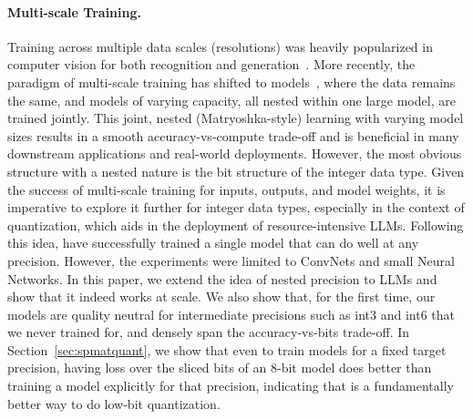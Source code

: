 \paragraph{Multi-scale Training.} Training across multiple data scales (resolutions) was heavily popularized in computer vision for both recognition and generation~\citep{adelson1984pyramid,lin2017feature,denton2015deep}. More recently, the paradigm of multi-scale training has shifted to models~\citep{rippel2014learning,yu2018slimmable,kusupati2022matryoshka,devvrit2023matformer}, where the data remains the same, and models of varying capacity, all nested within one large model, are trained jointly. This joint, nested (Matryoshka-style) learning with varying model sizes results in a smooth accuracy-vs-compute trade-off and is beneficial in many downstream applications and real-world deployments. However, the most obvious structure with a nested nature is the bit structure of the integer data type. Given the success of multi-scale training for inputs, outputs, and model weights, it is imperative to explore it further for integer data types, especially in the context of quantization, which aids in the deployment of resource-intensive LLMs. Following this idea, \citet{any_precision_dnn} have successfully trained a single model that can do well at any precision. However, the experiments were limited to ConvNets and small Neural Networks. In this paper, we extend the idea of nested precision to LLMs and show that it indeed works at scale. We also show that, for the first time, our models are quality neutral for intermediate precisions such as int3 and int6 that we never trained for, and densely span the accuracy-vs-bits trade-off. In Section~\ref{sec:spmatquant}, we show that even to train models for a fixed target precision, having loss over the sliced bits of an 8-bit model does better than training a model explicitly for that precision, indicating that \alg is a fundamentally better way to do low-bit quantization.




